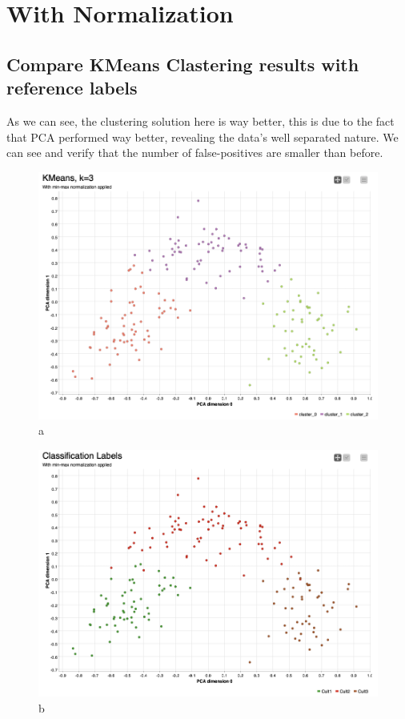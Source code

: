 \documentclass[openany]{book}
\begin{document}
		\section{With Normalization}
			\subsection{Compare KMeans Clastering results with reference labels}
				As we can see, the clustering solution here is way better, this is due to the fact that PCA performed way better, revealing the data's well separated
				nature. We can see and verify that the number of false-positives are smaller than before.
				\begin{figure}[H]
					\iftrue
					\centering
					\caption{a}
					\includegraphics[scale=0.3]{res/task1.2.kmeans}
					\fi
				\end{figure}
				\begin{figure}[H]
					\iftrue
					\centering
					\caption{b}
					\includegraphics[scale=0.3]{res/task1.2.nokmeans}
					\fi
				\end{figure}
\end{document}
